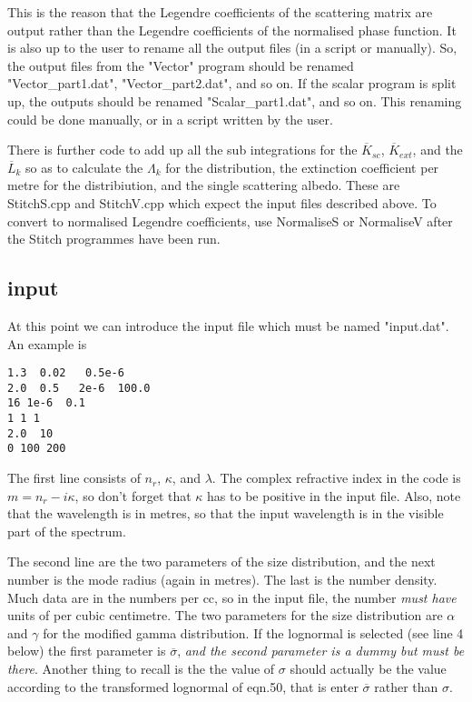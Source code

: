 \begin{flushleft}
This is the reason that the Legendre coefficients of the scattering matrix
are output rather than the Legendre coefficients of the normalised phase function.
It is also up to the user to rename all the output files (in a script or manually).
So, the output files from the "Vector" program should be renamed "Vector\_part1.dat",
 "Vector\_part2.dat", and so on. If the scalar program is split up, the outputs
should be renamed "Scalar\_part1.dat", and so on. This renaming could be done
 manually, or in a script written by the user.

There is  further code to add up all the sub integrations for the ${\overline K_{sc}}$,
 ${\overline K_{ext}}$, 
and the ${\overline L_k}$ so as to calculate the $\Lambda_k$
for the distribution, the extinction coefficient per metre for the distribiution, and
the single scattering albedo. These are StitchS.cpp and StitchV.cpp which expect the 
input files described above. To convert to normalised Legendre coefficients, use NormaliseS or NormaliseV after the Stitch programmes have been run.


\subsection{input}
At this point we can introduce the input file which must be named "input.dat".
An example is
\begin{verbatim}
1.3  0.02   0.5e-6         
2.0  0.5   2e-6  100.0
16 1e-6  0.1
1 1 1
2.0  10
0 100 200
\end{verbatim}
The first line consists of $n_r$, $\kappa$, and $\lambda$. The complex
refractive index  in the code is $m=n_r-i \kappa$, so don't forget that $\kappa$ has
to be positive in the input file. Also, note that the wavelength is in metres,
so that the input wavelength is in the visible part of the spectrum.

The second line are the two  parameters of the size distribution,
and the next number is the mode radius (again in metres). The last is
the number density. Much data are in the numbers per cc, so in the input
file, the number {\it must have} units of per cubic centimetre.
 The two parameters for the 
size distribution are $\alpha$ and $\gamma$ for the modified gamma distribution.
If the lognormal is selected (see line 4 below) the first parameter is 
${\overline \sigma}$, {\it and the second parameter is a dummy but must be there}. 
Another thing to recall is the the value of $\sigma$ should actually be
the value according to the transformed lognormal of eqn.50, that is
enter ${\overline \sigma}$ rather than $\sigma$.  


\end{flushleft}
